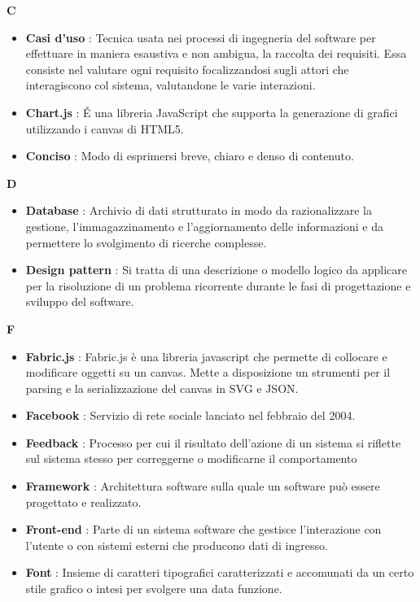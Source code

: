 \newpage
{\huge \textbf{C}}
\begin{flushleft}
\begin{itemize}[label={}]
\item \textbf{Casi d'uso} : Tecnica usata nei processi di ingegneria del software per effettuare in maniera esaustiva e non ambigua, la raccolta dei requisiti. Essa consiste nel valutare ogni requisito focalizzandosi sugli attori che interagiscono col sistema, valutandone le varie interazioni.
\item \textbf{Chart.js} : \'E una libreria JavaScript che supporta la generazione di grafici utilizzando i canvas di HTML5.
\item \textbf{Conciso} : Modo di esprimersi breve, chiaro e denso di contenuto.
\end{itemize}
\end{flushleft}
\newpage
{\huge \textbf{D}}
\begin{flushleft}
	\begin{itemize}[label={}]
		\item \textbf{Database} :  Archivio di dati strutturato in modo da razionalizzare la gestione, l'immagazzinamento e l'aggiornamento delle informazioni e da permettere lo svolgimento di ricerche complesse.
		\item \textbf{Design pattern} : Si tratta di una descrizione o modello logico da applicare per la risoluzione di un problema ricorrente durante le fasi di progettazione e sviluppo del software.
	\end{itemize}
\end{flushleft}
\newpage
{\huge \textbf{F}}
\begin{flushleft}
\begin{itemize}[label={}]
\item \textbf{Fabric.js} : Fabric.js è una libreria javascript che permette di collocare e modificare oggetti su un canvas. Mette a disposizione un strumenti per il parsing e la serializzazione del canvas in SVG e JSON.
\item \textbf{Facebook} : Servizio di rete sociale lanciato nel febbraio del 2004.
\item \textbf{Feedback} : Processo per cui il risultato dell'azione di un sistema si riflette sul sistema stesso per correggerne o modificarne il comportamento
\item \textbf{Framework} : Architettura software sulla quale un software può essere progettato e realizzato.
\item \textbf{Front-end} : Parte di un sistema software che gestisce l'interazione con l'utente o con sistemi esterni che producono dati di ingresso.
\item \textbf{Font} : Insieme di caratteri tipografici caratterizzati e accomunati da un certo stile grafico o intesi per svolgere una data funzione.
\end{itemize}
\end{flushleft}
